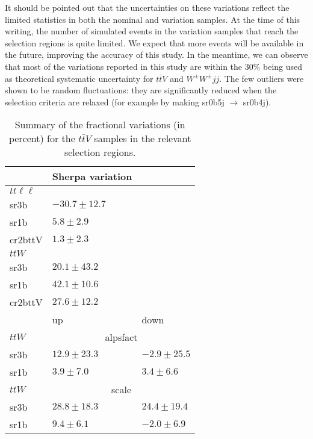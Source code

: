It should be pointed out that the uncertainties on these variations
reflect the limited statistics in both the nominal and variation
samples. At the time of this writing, the number of simulated events
in the variation samples that reach the selection regions is quite
limited. We expect that more events will be available in the future,
improving the accuracy of this study. In the meantime, we can observe
that most of the variations reported in this study are within the
$30\%$ being used as theoretical systematic uncertainty for
$t\bar{t}V$ and $W^\pm{}W^\pm{}jj$. The few outliers were shown to be
random fluctuations: they are significantly reduced when the selection
criteria are relaxed (for example by making sr0b5j $\to{}$ sr0b4j).
%
%
\begin{table}[htb]
  \caption{Summary of the fractional variations (in percent) for the
    $t\bar{t}V$ samples in the relevant selection regions.}
\begin{center}
\begin{tabular}{lll}
\hline
 & Sherpa variation & \\
\hline
$tt\ell\ell$ &  & \\
sr3b & $-30.7 \pm 12.7$ & \\
sr1b & $5.8 \pm 2.9$ & \\
cr2bttV & $1.3 \pm 2.3$ & \\
\hline
$ttW$ &  & \\
sr3b & $20.1 \pm 43.2$ & \\
sr1b & $42.1 \pm 10.6$ & \\
cr2bttV & $27.6 \pm 12.2$ & \\
\hline
 & up & down\\
\hline
$ttW$ & \multicolumn{2}{c}{alpsfact} \\
sr3b & $12.9 \pm 23.3$ & $-2.9 \pm 25.5$\\
sr1b & $3.9 \pm 7.0$ & $3.4 \pm 6.6$\\
\hline
$ttW$ & \multicolumn{2}{c}{scale} \\
sr3b & $28.8 \pm 18.3$ & $24.4 \pm 19.4$\\
sr1b & $9.4 \pm 6.1$ & $-2.0 \pm 6.9$\\
\hline
\end{tabular}
\end{center}
\label{tab:app_ttvvariations}
\end{table}
%
%
